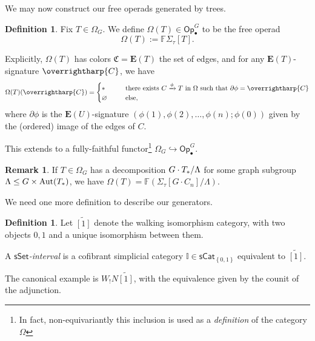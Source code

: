 \documentclass[a4paper,10pt
,draft
]{article}%
\numberwithin{equation}{section}
\numberwithin{figure}{section}
\theoremstyle{definition} %
\newtheorem{definition}[equation]{Definition}%
\newtheorem{remark}[equation]{Remark}%
\newcommand{\set}[1]{\left\{#1\right\}}%
\newcommand{\into}{\hookrightarrow}%
\newcommand{\vect}[1]{\text{\overrightharp{\ensuremath{#1}}}}
\newcommand{\sSet}{\ensuremath{\mathsf{sSet}}}%
\newcommand{\Op}{\mathsf{Op}}%
\DeclareMathOperator{\Aut}{Aut}%
\newcommand{\1}{\ensuremath{\mathbbm 1}}%
\begin{document}
We may now construct our free operads generated by trees.

\begin{definition}
      \label{OT_DEF}
      Fix $T \in \Omega_G$.
      We define $\Omega(T) \in \Op_\bullet^G$ to be the free operad
      \[
            \Omega(T) := \mathbb F \Sigma_\tau[T].
      \]
\end{definition}
Explicitly, $\Omega(T)$ has colors $\mathfrak C = \boldsymbol{E}(T)$ the set of edges, and
for any $\boldsymbol{E}(T)$-signature $\vect C$, we have
\begin{equation}
      \label{OMEGADEF_EQ}
      \Omega(T)(\vect C) =
      \begin{cases}
            \** \qquad & \mbox{there exists $C \xrightarrow{\phi} T$ in $\Omega$ such that $\partial \phi = \vect C$}
            \\
            \varnothing & \text{else,}
      \end{cases}
\end{equation}
where $\partial \phi$ is the $\mathbf E(U)$-signature $(\phi(1), \phi(2), \dots, \phi(n); \phi(0))$
given by the (ordered) image of the edges of $C$.

This extends to a fully-faithful functor\footnote{In fact, non-equivariantly this inclusion is used as a \textit{definition} of the category $\Omega$} $\Omega_G \into \Op_\bullet^G$.

\begin{remark}
      If $T \in \Omega_G$ has a decomposition $G \cdot T_{\**}/\Lambda$ for some graph subgroup $\Lambda \leq G \times \Aut(T_{\**})$,
we have $\Omega(T) = \mathbb{F} \left( \Sigma_{\tau}[G \cdot C_n]/\Lambda \right)$.
\end{remark}


We need one more definition to describe our generators.
\begin{definition}
      Let $\widetilde{[1]}$ denote the walking isomorphism category,
      with two objects $0,1$ and a unique isomorphism between them.
      
      A \textit{$\sSet$-interval} is a cofibrant simplicial category $\mathbb I \in \mathsf{sCat}_{\set{0,1}}$ equivalent to $\widetilde{[1]}$.
\end{definition}
The canonical example is $W_!N\widetilde{[1]}$, with the equivalence given by the counit of the adjunction.
\end{document}
